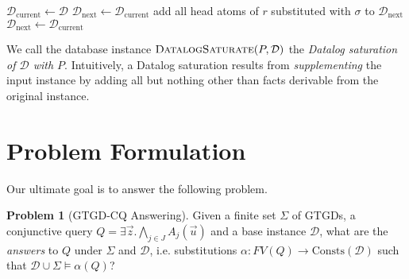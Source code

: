 \documentclass[12pt]{report}
\theoremstyle{plain}
\theoremstyle{definition}
\newtheorem{problem}[theorem]{Problem}
\def\Consts{{\mathrm{Consts}}}
\begin{document}
\begin{algorithm}
\caption{Answering Datalog query using Naive Evaluation}
\label{naive-evaluation-algorithm}
\begin{algorithmic}[1]
  \State $\mathcal{D}_\mathrm{current} \gets \mathcal{D}$
    \State $\mathcal{D}_\mathrm{next} \gets \mathcal{D}_\mathrm{current}$
        \State add all head atoms of $r$ substituted with $\sigma$ to $\mathcal{D}_\mathrm{next}$
      \EndFor
    \EndFor
    \State
      \State $\mathcal{D}_\mathrm{next} \gets \mathcal{D}_\mathrm{current}$
    \Else
      \State {}
    \EndIf
  \EndWhile
\EndProcedure
\State
{}
  \State {}
\EndProcedure
\end{algorithmic}
\end{algorithm}

We call the database instance $\textsc{DatalogSaturate}(P, \mathcal{D})$ the \emph{Datalog saturation of $\mathcal{D}$ with $P$}. Intuitively, a Datalog saturation results from \emph{supplementing} the input instance by adding all but nothing other than facts derivable from the original instance.

\section{Problem Formulation}

Our ultimate goal is to answer the following problem.

\begin{problem}[GTGD-CQ Answering]
\label{GTGD-CQ-Answering}
  Given a finite set $\Sigma$ of GTGDs, a conjunctive query $Q = \exists \vec{z}. \bigwedge_{j \in J} A_j(\vec{u})$ and a base instance $\mathcal{D}$, what are the \emph{answers} to $Q$ under $\Sigma$ and $\mathcal{D}$, i.e. substitutions $\alpha: FV(Q) \rightarrow \Consts(\mathcal{D})$ such that $\mathcal{D} \cup \Sigma \models \alpha(Q)$?
\end{problem}

\end{document}
